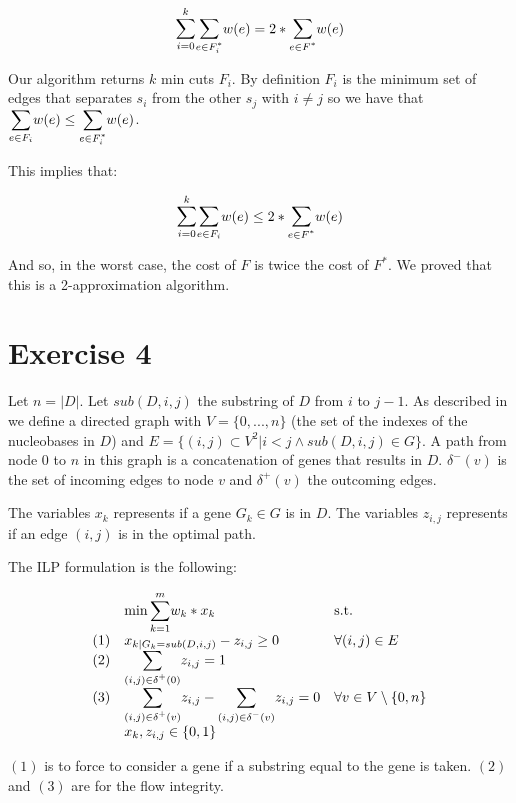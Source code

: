 \documentclass[paper=a4, fontsize=11pt]{scrartcl} %
\numberwithin{equation}{section} %
\numberwithin{figure}{section} %
\numberwithin{table}{section} %
\begin{document}
\[
\mathlarger{\sum}_{i = 0}^k \mathlarger{\sum}_{e \in F_i^*} w(e) = 2*\mathlarger{\sum}_{e \in F^*} w(e)
\]

Our algorithm returns $k$ min cuts $F_i$. By definition $F_i$ is the minimum set of edges that separates $s_i$ from the other $s_j$ with $i \ne j$ so we have that $\mathlarger{\sum}_{e \in F_i} w(e) \leq \mathlarger{\sum}_{e \in F_i^*} w(e)$.

This implies that:

\[
\mathlarger{\sum}_{i = 0}^k \mathlarger{\sum}_{e \in F_i} w(e) \leq 2*\mathlarger{\sum}_{e \in F^*} w(e)
\]

And so, in the worst case, the cost of $F$ is twice the cost of $F^*$. We proved that this is a 2-approximation algorithm.

\newpage
\section{Exercise 4}

Let $n = |D|$. Let $sub(D,i,j)$ the substring of $D$ from $i$ to $j-1$. As described in \cite{chris} we define a directed graph with $V = \{0, ..., n\}$ (the set of the indexes of the nucleobases in $D$) and $E = \{(i,j) \subset V^2| i < j \land sub(D,i,j) \in G\}$. A path from node $0$ to $n$ in this graph is a concatenation of genes that results in $D$. $\delta^-(v)$ is the set of incoming edges to node $v$ and $\delta^+(v)$ the outcoming edges. 

The variables $x_k$ represents if a gene $G_k \in G$ is in $D$.
The variables $z_{i,j}$ represents if an edge $(i,j)$ is in the optimal path.

The ILP formulation is the following:

\[
    \begin{array}{lll}
    & \min \mathlarger{\sum}_{k = 1}^m w_k*x_k & \text{s.t.}\\
    (1) & x_{k|G_k = sub(D,i,j)} - z_{i,j} \geq 0 & \forall (i,j) \in E\\
    (2) & \mathlarger{\sum}_{(i,j) \in \delta^+(0)} z_{i,j} = 1 & \\
    (3) & \mathlarger{\sum}_{(i,j) \in \delta^+(v)} z_{i,j} - \mathlarger{\sum}_{(i,j) \in \delta^-(v)} z_{i,j} = 0 & \forall v \in V \setminus \{0,n\}\\
    & x_k, z_{i,j} \in \{0,1\} & \\
    \end{array}
\]

$(1)$ is to force to consider a gene if a substring equal to the gene is taken. $(2)$ and $(3)$ are for the flow integrity.
\end{document}
